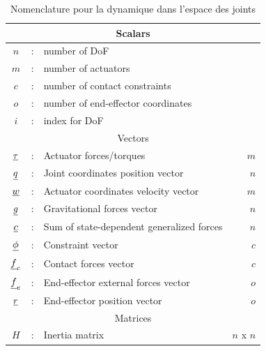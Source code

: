 {\begin{table}[htbp]
	\centering
	\caption{Nomenclature pour la dynamique dans l'espace des joints}	%
		\begin{tabular}{ c c l r }
        \hline \hline
				\multicolumn{4}{c}{Scalars} \\
				\hline \hline
			$n$             &  :  & number of DoF                                              & \\
			$m$             &  :  & number of actuators                                        & \\
			$c$             &  :  & number of contact constraints                              & \\
			$o$             &  :  & number of end-effector coordinates                         & \\ 
			$i$             &  :  & index for DoF                                              & \\ 
			\hline \hline
			\multicolumn{4}{c}{Vectors} \\
			\hline \hline
			$\underline{\tau}$    &  :  & Actuator forces/torques                                    & $m$  \\
			$\underline{q}$       &  :  & Joint coordinates position vector                          & $n$  \\
			$\underline{w}$       &  :  & Actuator coordinates velocity vector                          & $m$  \\ 
			$\underline{g}$       &  :  & Gravitational forces vector                                & $n$  \\
			$\underline{c}$       &  :  & Sum of state-dependent generalized forces                  & $n$  \\
			$\underline{\phi}$    &  :  & Constraint vector                                          & $c$  \\
			$\underline{f}_c$     &  :  & Contact forces vector                                      & $c$  \\
			$\underline{f}_e$     &  :  & End-effector external forces vector                        & $o$  \\
			$\underline{r}$       &  :  & End-effector position vector                               & $o$  \\
			\hline \hline
			\multicolumn{4}{c}{Matrices} \\
			\hline \hline
			$H$             &  :  & Inertia matrix                                             & $n$ x $n$ \\

\end{tabular}
\end{table}}
